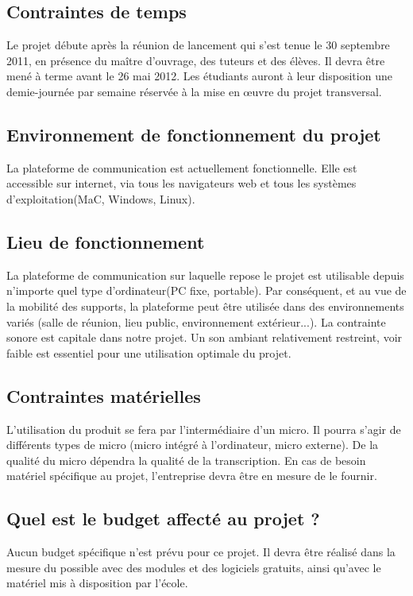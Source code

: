 			\subsection{Contraintes de temps}				
		Le projet débute après la réunion de lancement qui s'est tenue le 30 septembre 2011, en présence du maître d'ouvrage, des tuteurs et des élèves. Il devra être mené à terme avant le 26 mai 2012. Les étudiants auront à leur disposition une demie-journée par semaine réservée à la mise en œuvre du projet transversal.  
				

		        \subsection{Environnement de fonctionnement du projet}
			La plateforme de communication est actuellement fonctionnelle. Elle est accessible sur internet, via tous les navigateurs web et tous les systèmes d'exploitation(MaC, Windows, Linux). 

			\subsection{Lieu de fonctionnement}
			La plateforme de communication sur laquelle repose le projet est utilisable depuis n'importe quel type d'ordinateur(PC fixe, portable). Par conséquent, et au vue de la mobilité des supports, la plateforme peut être utilisée dans des environnements variés (salle de réunion, lieu public, environnement extérieur...). La contrainte sonore est capitale dans notre projet. Un son ambiant relativement restreint, voir faible est essentiel pour une utilisation optimale du projet.   
	

			\subsection{Contraintes matérielles}
			L'utilisation du produit se fera par l'intermédiaire d'un micro. Il pourra s'agir de différents types de micro (micro intégré à l'ordinateur, micro externe). De la qualité du micro dépendra la qualité de la transcription. En cas de besoin matériel spécifique au projet, l'entreprise devra être en mesure de le fournir. 

			\subsection{Quel est le budget affecté au projet ?}
			Aucun budget spécifique n'est prévu pour ce projet. Il devra être réalisé dans la mesure du possible avec des modules et des logiciels gratuits, ainsi qu'avec le matériel mis à disposition par l'école.  
			

